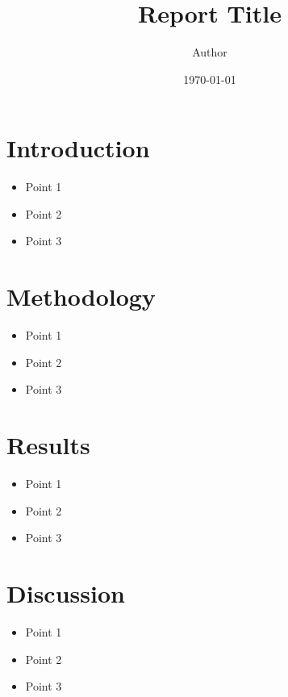 \documentclass{article}
\title{\textbf{\LARGE Report Title}}
\author{\Large Author}
\date{\Large \today}
\begin{document}
\maketitle

\section{Introduction}
\begin{keypoints}
\begin{itemize}
  \item Point 1
  \item Point 2
  \item Point 3
\end{itemize}
\end{keypoints}

\lipsum[1] %

\section{Methodology}
\begin{keypoints}
\begin{itemize}
  \item Point 1
  \item Point 2
  \item Point 3
\end{itemize}
\end{keypoints}

\lipsum[2] %

\section{Results}
\begin{keypoints}
\begin{itemize}
  \item Point 1
  \item Point 2
  \item Point 3
\end{itemize}
\end{keypoints}

\lipsum[3] %

\section{Discussion}
\begin{keypoints}
\begin{itemize}
  \item Point 1
  \item Point 2
  \item Point 3
\end{itemize}
\end{keypoints}
\end{document}
